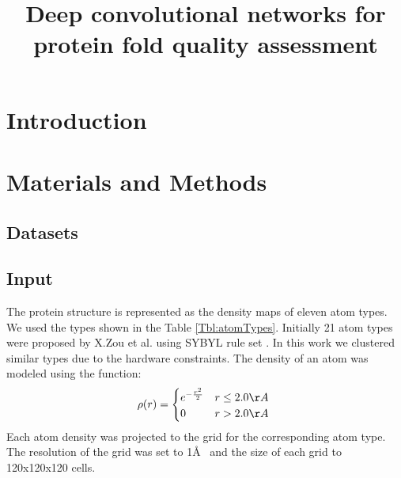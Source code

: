 \documentclass[a4paper,10pt]{article}
\title{Deep convolutional networks for protein fold quality assessment}
\author{}
\begin{document}
\maketitle

\begin{abstract}

\end{abstract}

\section{Introduction}
% 


\section{Materials and Methods}

\subsection{Datasets}
% 


\subsection{Input}
The protein structure is represented as the density maps of eleven atom types. 
We used the types shown in the Table \ref{Tbl:atomTypes}. Initially 21 atom types were proposed by X.Zou et al. 
\cite{huang2006iterative, huang2008iterative} using SYBYL rule set \cite{wang2006automatic}. In this work we clustered similar
types due to the hardware constraints. The density of an atom was modeled using the function: 
$$
\rho(r) =  \begin{cases}
               e^{-\frac{r^2}{2}}&r\leq 2.0\AA~\\
               0                 &r>2.0\AA~\\
            \end{cases}
$$
Each atom density was projected to the grid for the corresponding atom type. The resolution of the grid was set to 1\AA~ and the size of 
each grid to 120x120x120 cells.
\end{document}
